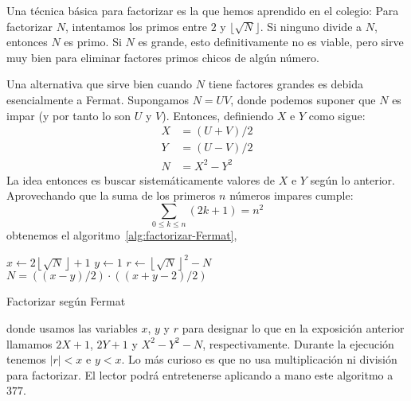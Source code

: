   Una técnica básica para factorizar
  es la que hemos aprendido en el colegio:
  Para factorizar \(N\),
  intentamos los primos entre \(2\) y \(\lfloor \sqrt{N} \rfloor\).
  Si ninguno divide a \(N\),
  entonces \(N\) es primo.
  Si \(N\) es grande,
  esto definitivamente no es viable,
  pero sirve muy bien
  para eliminar factores primos chicos de algún número.

  Una alternativa que sirve bien cuando \(N\) tiene factores grandes
  es debida esencialmente a Fermat.%
  Supongamos \(N = U V\),
  donde podemos suponer que \(N\) es impar
  (y por tanto lo son \(U\) y \(V\)).
  Entonces,
  definiendo \(X\) e \(Y\) como sigue:
  \begin{align*}
    X &= (U + V) / 2 \\
    Y &= (U - V) / 2 \\
    N &= X^2 - Y^2
  \end{align*}
  La idea entonces es buscar sistemáticamente
  valores de \(X\) e \(Y\) según lo anterior.
  Aprovechando que la suma de los primeros \(n\) números impares
  cumple:
  \begin{equation*}
    \sum_{0 \le k \le n} (2 k + 1) = n^2
  \end{equation*}
  obtenemos el algoritmo~\ref{alg:factorizar-Fermat},
  \begin{algorithm}[htbp]
    \DontPrintSemicolon

    \KwFunction {} \;
    \BlankLine
    \(x \leftarrow 2 \left\lfloor \sqrt{N} \right\rfloor + 1\) \;
    \(y \leftarrow 1\) \;
    \(r \leftarrow \left\lfloor \sqrt{N} \right\rfloor^2 - N\) \;
    \Return \(N = \left((x - y)/2\right) \cdot \left((x + y - 2)/2\right)\) \;
    \caption{Factorizar según Fermat}
    \label{alg:factorizar-Fermat}
  \end{algorithm}
  donde usamos las variables \(x\), \(y\) y \(r\)
  para designar lo que en la exposición anterior
  llamamos \(2X + 1\), \(2Y + 1\) y \(X^2 - Y^2 -N\),
  respectivamente.
  Durante la ejecución tenemos \(\lvert r \rvert < x\) e \(y < x\).
  Lo más curioso
  es que no usa multiplicación ni división para factorizar.
  El lector podrá entretenerse aplicando a mano
  este algoritmo a \(377\).

